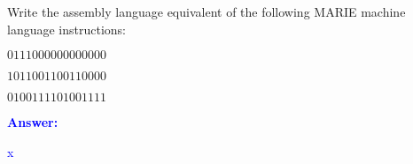 \item{}
 Write the assembly language equivalent of the following MARIE machine language instructions:
\begin{list}{\textbf{}}{}
    \item $0111000000000000$\\[12pt]
    \item $1011001100110000$\\[12pt]
    \item $0100111101001111$\\[12pt]
\end{list}
\vskip12pt
\ifanswers
\textcolor{blue}{
\textbf{Answer:}\\
\begin{list}{\textbf{}}{}
\item x
\end{list}
}
\newpage
\fi
